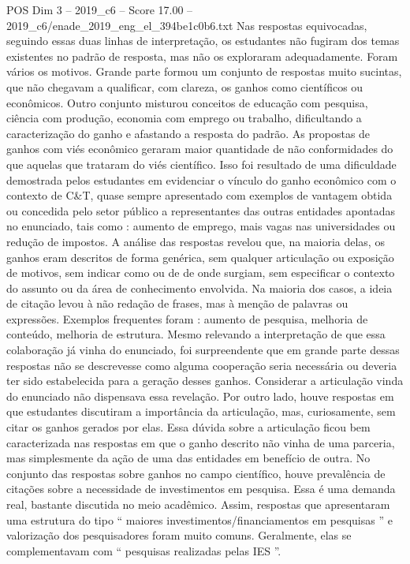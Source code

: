 \begin{textsample}{POS Dim 3 – 2019\_c6 – Score 17.00 – 2019\_c6/enade\_2019\_eng\_el\_394be1c0b6.txt}
Nas respostas equivocadas, seguindo essas duas linhas de interpretação, os estudantes não fugiram dos temas existentes no padrão de resposta, mas não os exploraram adequadamente.
Foram vários os motivos.
Grande parte formou um conjunto de respostas muito sucintas, que não chegavam a qualificar, com clareza, os ganhos como científicos ou econômicos.
Outro conjunto misturou conceitos de educação com pesquisa, ciência com produção, economia com emprego ou trabalho, dificultando a caracterização do ganho e afastando a resposta do padrão.
As propostas de ganhos com viés econômico geraram maior quantidade de não conformidades do que aquelas que trataram do viés científico.
Isso foi resultado de uma dificuldade demostrada pelos estudantes em evidenciar o vínculo do ganho econômico com o contexto de C\&T, quase sempre apresentado com exemplos de vantagem obtida ou concedida pelo setor público a representantes das outras entidades apontadas no enunciado, tais como : aumento de emprego, mais vagas nas universidades ou redução de impostos.
A análise das respostas revelou que, na maioria delas, os ganhos eram descritos de forma genérica, sem qualquer articulação ou exposição de motivos, sem indicar como ou de de onde surgiam, sem especificar o contexto do assunto ou da área de conhecimento envolvida.
Na maioria dos casos, a ideia de citação levou à não redação de frases, mas à menção de palavras ou expressões.
Exemplos frequentes foram : aumento de pesquisa, melhoria de conteúdo, melhoria de estrutura.
Mesmo relevando a interpretação de que essa colaboração já vinha do enunciado, foi surpreendente que em grande parte dessas respostas não se descrevesse como alguma cooperação seria necessária ou deveria ter sido estabelecida para a geração desses ganhos.
Considerar a articulação vinda do enunciado não dispensava essa revelação.
Por outro lado, houve respostas em que estudantes discutiram a importância da articulação, mas, curiosamente, sem citar os ganhos gerados por elas.
Essa dúvida sobre a articulação ficou bem caracterizada nas respostas em que o ganho descrito não vinha de uma parceria, mas simplesmente da ação de uma das entidades em benefício de outra.
No conjunto das respostas sobre ganhos no campo científico, houve prevalência de citações sobre a necessidade de investimentos em pesquisa.
Essa é uma demanda real, bastante discutida no meio acadêmico.
Assim, respostas que apresentaram uma estrutura do tipo “ maiores investimentos/financiamentos em pesquisas ” e valorização dos pesquisadores foram muito comuns.
Geralmente, elas se complementavam com “ pesquisas realizadas pelas IES ”.

\end{textsample}
